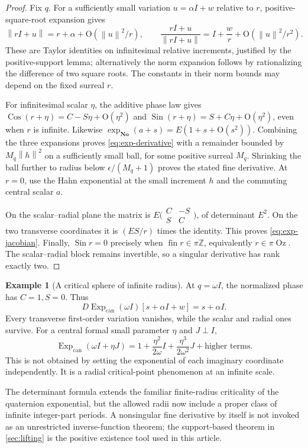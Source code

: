 \documentclass[11pt,letterpaper]{article}
\theoremstyle{definition}
\newtheorem{example}[theorem]{Example}
\newcommand{\No}{\mathbf{No}}
\newcommand{\Z}{\mathbb Z}
\newcommand{\norm}[1]{\left\lVert#1\right\rVert}
\DeclareMathOperator{\fin}{fin}
\DeclareMathOperator{\Sin}{Sin}
\DeclareMathOperator{\Cos}{Cos}
\DeclareMathOperator{\Oz}{Oz}
\newcommand{\ExpC}{\operatorname{Exp}_{\mathrm{can}}}
\newcommand{\bigO}{\mathrm{O}}
\begin{document}
\begin{proof}
Fix $q$. For a sufficiently small variation $u=\alpha I+w$ relative to $r$,
positive-square-root expansion gives
\[
 \norm{rI+u}=r+\alpha+\bigO(\norm u^2/r),\qquad
 \frac{rI+u}{\norm{rI+u}}
     =I+\frac{w}{r}+\bigO(\norm u^2/r^2).
\]
These are Taylor identities on infinitesimal relative increments, justified
by the positive-support lemma; alternatively the norm expansion follows by
rationalizing the difference of two square roots. The constants in their
norm bounds may depend on the fixed surreal $r$.

For infinitesimal scalar $\eta$, the additive phase law gives
$\Cos(r+\eta)=C-S\eta+\bigO(\eta^2)$ and
$\Sin(r+\eta)=S+C\eta+\bigO(\eta^2)$, even when $r$ is infinite.
Likewise $\exp_{\No}(a+s)=E(1+s+\bigO(s^2))$. Combining the three expansions
proves \eqref{eq:exp-derivative} with a remainder bounded by
$M_q\norm h^2$ on a sufficiently small ball, for some positive surreal $M_q$.
Shrinking the ball further to radius below $\epsilon/(M_q+1)$ proves the
stated fine derivative. At $r=0$, use the Hahn exponential at the small
increment $h$ and the commuting central scalar $a$.

On the scalar--radial plane the matrix is
$E\bigl(\begin{smallmatrix}C&-S\\S&C\end{smallmatrix}\bigr)$, of determinant
$E^2$. On the two transverse coordinates it is $(ES/r)$ times the identity.
This proves \eqref{eq:exp-jacobian}. Finally, $\Sin r=0$ precisely when
$\fin r\in\pi\Z$, equivalently $r\in\pi\Oz$. The scalar--radial block remains
invertible, so a singular derivative has rank exactly two.
\end{proof}

\begin{example}[A critical sphere of infinite radius]
At $q=\omega I$, the normalized phase has $C=1,S=0$. Thus
\[
 D\ExpC(\omega I)[s+\alpha I+w]=s+\alpha I.
\]
Every transverse first-order variation vanishes, while the scalar and radial
ones survive. For a central formal small parameter $\eta$ and $J\perp I$,
\[
 \ExpC(\omega I+\eta J)
    =1+\frac{\eta^2}{2\omega}I
       +\frac{\eta^3}{2\omega^2}J+\text{higher terms}.
\]
This is not obtained by setting the exponential of each imaginary coordinate
independently. It is a radial critical-point phenomenon at an infinite scale.
\end{example}
The determinant formula extends the familiar finite-radius criticality of the
quaternion exponential, but the allowed radii now include a proper class of
infinite integer-part periods. A nonsingular fine derivative by itself is not
invoked as an unrestricted inverse-function theorem; the support-based theorem
in \cref{sec:lifting} is the positive existence tool used in this article.
\end{document}
